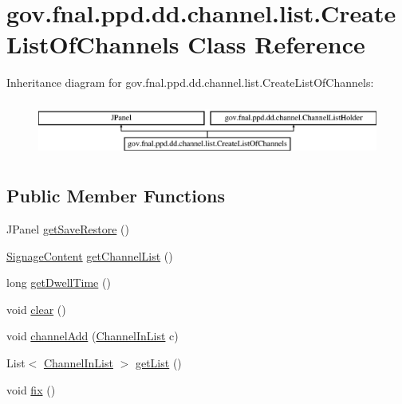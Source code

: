 \hypertarget{classgov_1_1fnal_1_1ppd_1_1dd_1_1channel_1_1list_1_1CreateListOfChannels}{\section{gov.\-fnal.\-ppd.\-dd.\-channel.\-list.\-Create\-List\-Of\-Channels Class Reference}
\label{classgov_1_1fnal_1_1ppd_1_1dd_1_1channel_1_1list_1_1CreateListOfChannels}
}
Inheritance diagram for gov.\-fnal.\-ppd.\-dd.\-channel.\-list.\-Create\-List\-Of\-Channels\-:\begin{figure}[H]
\begin{center}
\leavevmode
\includegraphics[height=1.836066cm]{classgov_1_1fnal_1_1ppd_1_1dd_1_1channel_1_1list_1_1CreateListOfChannels}
\end{center}
\end{figure}
\subsection*{Public Member Functions}
\begin{DoxyCompactItemize}
\item 
J\-Panel \hyperlink{classgov_1_1fnal_1_1ppd_1_1dd_1_1channel_1_1list_1_1CreateListOfChannels_a61f43bd5b3bba837c4f210f5d5dae22f}{get\-Save\-Restore} ()
\item 
\hyperlink{interfacegov_1_1fnal_1_1ppd_1_1dd_1_1signage_1_1SignageContent}{Signage\-Content} \hyperlink{classgov_1_1fnal_1_1ppd_1_1dd_1_1channel_1_1list_1_1CreateListOfChannels_a1dd7205ca04851ccb375e04919cb91ca}{get\-Channel\-List} ()
\item 
long \hyperlink{classgov_1_1fnal_1_1ppd_1_1dd_1_1channel_1_1list_1_1CreateListOfChannels_afe71d92d0b9f2df4eccd8a4ddefa08a0}{get\-Dwell\-Time} ()
\item 
void \hyperlink{classgov_1_1fnal_1_1ppd_1_1dd_1_1channel_1_1list_1_1CreateListOfChannels_a1ec0b549bcd66b851487792a951880f2}{clear} ()
\item 
void \hyperlink{classgov_1_1fnal_1_1ppd_1_1dd_1_1channel_1_1list_1_1CreateListOfChannels_a45a7590a0959d934a3c084af35bcd80c}{channel\-Add} (\hyperlink{classgov_1_1fnal_1_1ppd_1_1dd_1_1channel_1_1ChannelInList}{Channel\-In\-List} c)
\item 
List$<$ \hyperlink{classgov_1_1fnal_1_1ppd_1_1dd_1_1channel_1_1ChannelInList}{Channel\-In\-List} $>$ \hyperlink{classgov_1_1fnal_1_1ppd_1_1dd_1_1channel_1_1list_1_1CreateListOfChannels_a69c4ef63a7b4679fdb998e5a801b8203}{get\-List} ()
\item 
void \hyperlink{classgov_1_1fnal_1_1ppd_1_1dd_1_1channel_1_1list_1_1CreateListOfChannels_a5b161ef966b292e003862b6aeb584647}{fix} ()
\end{DoxyCompactItemize}
